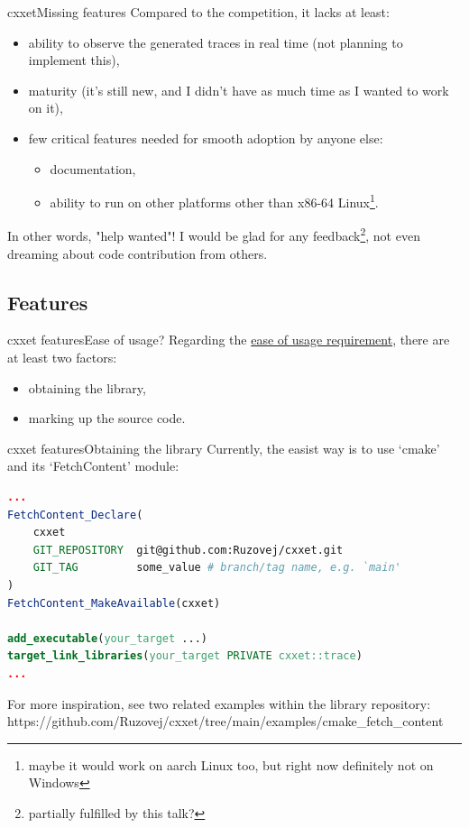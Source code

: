 \documentclass[aspectratio=169]{beamer}
\begin{document}
\begin{frame}{cxxet}{Missing features}
    Compared to the competition, it lacks at least:

    \begin{itemize}
        \item ability to observe the generated traces in real time (not planning to implement this),
        \item maturity (it's still new, and I didn't have as much time as I wanted to work on it),
        \item few critical features needed for smooth adoption by anyone else:
        \begin{itemize}
            \item documentation,
            \item ability to run on other platforms other than x86-64 Linux\footnote{maybe it would work on aarch Linux too, but right now definitely not on Windows}.
        \end{itemize}
    \end{itemize}

    In other words, "help wanted"! I would be glad for any feedback\footnote{partially fulfilled by this talk?}, not even dreaming about code contribution from others.

\end{frame}


\subsection{Features}

\begin{frame}{cxxet features}{Ease of usage?}
    Regarding the \hyperlink{easy_usage}{ease of usage requirement}, there are at least two factors:

    \begin{itemize}
        \item obtaining the library,
        \item marking up the source code.
    \end{itemize}

\end{frame}

\begin{frame}[fragile]{cxxet features}{Obtaining the library}
    Currently, the easist way is to use `cmake' and its `FetchContent' module:

    \begin{lstlisting}[language=cmake]
...
FetchContent_Declare(
    cxxet
    GIT_REPOSITORY  git@github.com:Ruzovej/cxxet.git
    GIT_TAG         some_value # branch/tag name, e.g. `main'
)
FetchContent_MakeAvailable(cxxet)

add_executable(your_target ...)
target_link_libraries(your_target PRIVATE cxxet::trace)
...
    \end{lstlisting}

    For more inspiration, see two related examples within the library repository: https://github.com/Ruzovej/cxxet/tree/main/examples/cmake\_fetch\_content

\end{frame}
\end{document}
